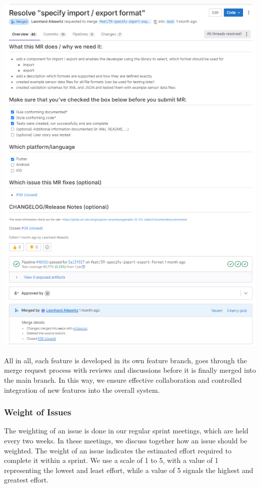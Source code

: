 \documentclass[12pt]{article}
\begin{document}
     \begin{minipage}[t]{0.55\textwidth}
        \vspace{-\baselineskip}
        \includegraphics[width=\textwidth]{mr.png}
    \end{minipage}
    
    All in all, each feature is developed in its own feature branch, goes through the merge request process with reviews and discussions before it is finally merged into the main branch. In this way, we ensure effective collaboration and controlled integration of new features into the overall system.
\subsubsection{Weight of Issues}
The weighting of an issue is done in our regular sprint meetings, which are held every two weeks. In these meetings, we discuss together how an issue should be weighted. The weight of an issue indicates the estimated effort required to complete it within a sprint. We use a scale of 1 to 5, with a value of 1 representing the lowest and least effort, while a value of 5 signals the highest and greatest effort.
\end{document}
